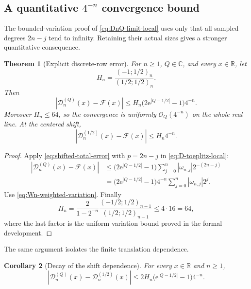 \documentclass[11pt,oneside]{article}
\newtheorem{theorem}{Theorem}[section]
\newtheorem{corollary}[theorem]{Corollary}
\theoremstyle{definition}
\theoremstyle{remark}
\newcommand{\R}{\mathbb R}
\newcommand{\C}{\mathbb C}
\newcommand{\e}{\mathrm e}
\newcommand{\bigO}{\mathcal O}
\begin{document}
\subsection[A quantitative four-to-the-minus-n convergence bound]{A quantitative $4^{-n}$ convergence bound}

The bounded-variation proof of \eqref{eq:DnQ-limit-local} uses only that all sampled degrees
$2n-j$ tend to infinity.  Retaining their actual sizes gives a stronger quantitative
consequence.

\begin{theorem}[Explicit discrete-row error]
\label{thm:D-error}
For $n\ge1$, $Q\in\C$, and every $x\in\R$, let
\begin{equation}
 H_n=\frac{(-1;1/2)_n}{(1/2;1/2)_n}.                      \label{eq:Hn-def}
\end{equation}
Then
\begin{equation}
 \boxed{
 |\mathcal D_n^{(Q)}(x)-\mathcal F(x)|
 \le H_n\bigl(2\e^{|Q-1/2|}-1\bigr)4^{-n}.}              \label{eq:D-error}
\end{equation}
Moreover $H_n\le64$, so the convergence is uniformly $\bigO_Q(4^{-n})$ on the whole real
line.  At the centered shift,
\begin{equation}
 |\mathcal D_n^{(1/2)}(x)-\mathcal F(x)|\le H_n4^{-n}.     \label{eq:D-centered-error}
\end{equation}
\end{theorem}

\begin{proof}
Apply \eqref{eq:shifted-total-error} with $p=2n-j$ in
\eqref{eq:D-toeplitz-local}:
\begin{align*}
 |\mathcal D_n^{(Q)}(x)-\mathcal F(x)|
 &\le\bigl(2\e^{|Q-1/2|}-1\bigr)
 \sum_{j=0}^{n}|\omega_{n,j}|2^{-(2n-j)}\\
 &=\bigl(2\e^{|Q-1/2|}-1\bigr)4^{-n}
 \sum_{j=0}^{n}|\omega_{n,j}|2^j.
\end{align*}
Use \eqref{eq:Wn-weighted-variation}.  Finally
\[
 H_n
 =\frac{2}{1-2^{-n}}
   \frac{(-1/2;1/2)_{n-1}}{(1/2;1/2)_{n-1}}
 \le4\cdot16=64,
\]
where the last factor is the uniform variation bound proved in the formal development.
\end{proof}

The same argument isolates the finite translation dependence.

\begin{corollary}[Decay of the shift dependence]
\label{cor:D-Q-decay}
For every $x\in\R$ and $n\ge1$,
\begin{equation}
 |\mathcal D_n^{(Q)}(x)-\mathcal D_n^{(1/2)}(x)|
 \le2H_n\bigl(\e^{|Q-1/2|}-1\bigr)4^{-n}.                \label{eq:D-Q-decay}
\end{equation}
\end{corollary}
\end{document}
